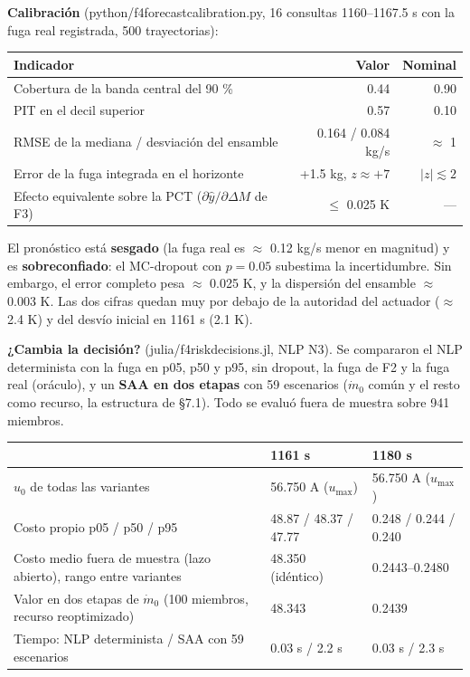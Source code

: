 \documentclass[11pt,a4paper]{article}
\newcommand{\codeus}{\textunderscore\allowbreak}
\newcommand{\code}[1]{{\small\ttfamily\let\_\codeus #1}}
\begin{document}
\textbf{Calibración} (\code{python/f4\_forecast\_calibration.py}, 16 consultas 1160–1167.5 s con la fuga real registrada, 500 trayectorias):

{\small
\begin{xltabular}{\linewidth}{@{}YRR@{}}
\toprule
\textbf{Indicador} & \textbf{Valor} & \textbf{Nominal} \\
\midrule
\endhead
Cobertura de la banda central del 90 \% & 0.44 & 0.90 \\
PIT en el decil superior & 0.57 & 0.10 \\
RMSE de la mediana / desviación del ensamble & 0.164 / 0.084 kg/s & $\approx$ 1 \\
Error de la fuga integrada en el horizonte & +1.5 kg, $z\approx+7$ & $|z|\lesssim 2$ \\
Efecto equivalente sobre la PCT ($\partial\hat y/\partial\Delta M$ de F3) & $\le$ 0.025 K & — \\
\bottomrule
\end{xltabular}}

El pronóstico está \textbf{sesgado} (la fuga real es $\approx$ 0.12 kg/s menor en magnitud) y es \textbf{sobreconfiado}: el MC-dropout con $p=0.05$ subestima la incertidumbre. Sin embargo, el error completo pesa $\approx$ 0.025 K, y la dispersión del ensamble $\approx$ 0.003 K. Las dos cifras quedan muy por debajo de la autoridad del actuador ($\approx$ 2.4 K) y del desvío inicial en 1161 s (2.1 K).

\textbf{¿Cambia la decisión?} (\code{julia/f4\_risk\_decisions.jl}, NLP N3). Se compararon el NLP determinista con la fuga en p05, p50 y p95, sin dropout, la fuga de F2 y la fuga real (oráculo), y un \textbf{SAA en dos etapas} con 59 escenarios ($\dot m_0$ común y el resto como recurso, la estructura de \S{}7.1). Todo se evaluó fuera de muestra sobre 941 miembros.

{\small
\begin{xltabular}{\linewidth}{@{}YYY@{}}
\toprule
\textbf{} & \textbf{1161 s} & \textbf{1180 s} \\
\midrule
\endhead
$u_0$ de todas las variantes & 56.750 A ($u_{\max}$) & 56.750 A ($u_{\max}$) \\
Costo propio p05 / p50 / p95 & 48.87 / 48.37 / 47.77 & 0.248 / 0.244 / 0.240 \\
Costo medio fuera de muestra (lazo abierto), rango entre variantes & 48.350 (idéntico) & 0.2443–0.2480 \\
Valor en dos etapas de $\dot m_0$ (100 miembros, recurso reoptimizado) & 48.343 & 0.2439 \\
Tiempo: NLP determinista / SAA con 59 escenarios & 0.03 s / 2.2 s & 0.03 s / 2.3 s \\
\bottomrule
\end{xltabular}}
\end{document}
